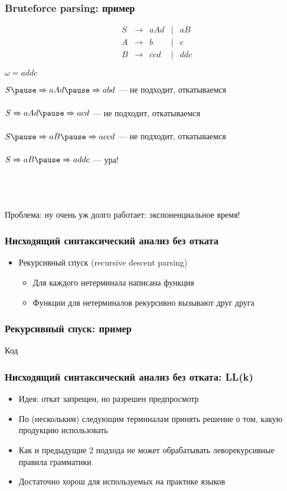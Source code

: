 \documentclass{beamer}
\newcommand{\derives}[0]{\xRightarrow[]{}}
\begin{document}
\begin{frame}[fragile]
  \transwipe[direction=90]
  \frametitle{Bruteforce parsing: пример}

  $$
  \begin{array}{crcccl}
  &S& \rightarrow & a A d & | & a B \\
  &A& \rightarrow & b     & | & c \\
  &B& \rightarrow & c c d & | & d d c
  \end{array}
  $$
  
  $\omega = a d d c$ \pause 
  
  $S \pause \derives a A d \pause \derives a b d$ \pause --- не подходит, откатываемся \pause 
  
  $S \derives a A d \pause \derives a c d$ \pause --- не подходит, откатываемся \pause 
  
  $S \pause \derives a B \pause \derives a c c d$ \pause --- не подходит, откатываемся \pause 
  
  $S \derives a B \pause \derives a d d c$ \pause --- ура!
  
  ~\\~
  
  Проблема: ну очень уж долго работает: экспоненциальное время!
\end{frame}

\begin{frame}[fragile]
  \transwipe[direction=90]
  \frametitle{Нисходящий синтаксический анализ без отката}
  \begin{itemize}
    \item Рекурсивный спуск (recursive descent parsing)
    \begin{itemize}
      \item Для каждого нетерминала написана функция
      \item Функции для нетерминалов рекурсивно вызывают друг друга
    \end{itemize}
  \end{itemize}
\end{frame}

\begin{frame}[fragile]
  \transwipe[direction=90]
  \frametitle{Рекурсивный спуск: пример}
  Код
\end{frame}

\begin{frame}[fragile]
  \transwipe[direction=90]
  \frametitle{Нисходящий синтаксический анализ без отката: LL(k)}
  \begin{itemize}
    \item Идея: откат запрещен, но разрешен предпросмотр
    \item По (нескольким) следующим терминалам принять решение о том, какую продукцию использовать
    \item Как и предыдущие 2 подхода не может обрабатывать леворекурсивные правила грамматики
    \item Достаточно хорош для используемых на практике языков
  \end{itemize}
\end{frame}
\end{document}
